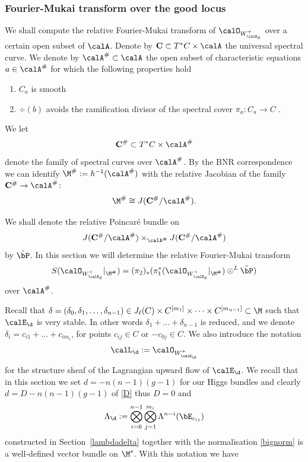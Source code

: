 \subsubsection{Fourier-Mukai transform over the good locus}

We shall compute the relative Fourier-Mukai transform of $\calO_{W_{\calE_\delta}^+}$ over a certain open subset of $\calA$. Denote by $\mathbf{C}\subset T^*C\times \calA$ the universal spectral curve.
We denote by $\calA^{\#}\subset \calA$ the open subset of characteristic equations $a\in\calA^{\#}$ for which the following  properties hold \begin{enumerate} \item $C_a$ is smooth \item $\div(b)$ avoids the ramification divisor of the spectral cover $\pi_a:C_a\to C$  %
	.\end{enumerate} We let $$\mathbf{C}^{\#}\subset T^*C\times \calA^{\#}$$ denote the family of spectral curves over $\calA^{\#}$. By the BNR correspondence we can identify $\M^{\#}:=h^{-1}(\calA^{\#})$ with the relative Jacobian of the family $\mathbf{C}^{\#}\to \calA^{\#}$: $$\M^{\#}\cong J({\mathbf{C}}^{\#}/{\calA}^{\#}).$$

We shall denote the relative Poincar\'e bundle on
$$J({\mathbf{C}}^{\#}/{\calA}^{\#})\times_{\calA^{\#}} J({\mathbf{C}}^{\#}/{\calA}^{\#})$$
by $\tilde{\bP}$.
In this section
we will determine the relative Fourier-Mukai transform $$S(\calO_{W_{\calE_\delta}^+}|_{\M^\#})=(\pi_2)_*(\pi_1^*(\calO_{W_{\calE_\delta}^+}|_{\M^\#})\otimes^L \tilde{\bP})$$ over $\calA^{\#}$.

Recall that $\delta=(\delta_0,\delta_1,\dots,\delta_{n-1}) \in J_\ell(C)\times C^{[m_1]}\times \dots \times C^{[m_{n-1}]}\subset \M$ such that $\calE_{\d}$ is very stable. In other words $\delta_1+\dots + \delta_{n-1}$ is reduced, and we denote $\delta_i=c_{i1}+\dots+c_{im_i}$, for points $c_{ij}\in C$ or $-c_{0j}\in C$.  We also introduce the notation $$\calL_{\d}:=\calO_{W^+_{\calE_{\d}}}$$ for the structure sheaf of the Lagrangian upward flow of $\calE_{\d}$. We recall that in this section we set $d=-n(n-1)(g-1)$ for our Higgs bundles and clearly $d=D-n(n-1)(g-1)$ of \eqref{D} thus $D=0$ and
$$\Lambda_{\d}:= \bigotimes_{i=0}^{n-1}\bigotimes_{j=1}^{m_i} \Lambda^{n-i}(\bE_{c_{ij}})$$ constructed in Section~\ref{lambdadelta} together with the normalisation \eqref{bignorm} is  a well-defined vector bundle on $\M^s$. With this notation we have

